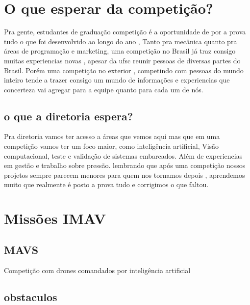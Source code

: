 \documentclass[letterpaper]{article}
\begin{document}
\section{ O que esperar da competição?}
Pra gente, estudantes de graduação competição é a oportunidade de por a prova tudo o que foi desenvolvido ao longo do ano , Tanto pra mecânica quanto pra áreas de programação e marketing, uma competição no Brasil já traz consigo muitas experiencias novas , apesar da ufsc reunir pessoas de diversas partes do Brasil. Porém uma competição no exterior , competindo com pessoas do mundo inteiro tende a trazer consigo um mundo de informações e experiencias que concerteza vai agregar para a equipe quanto para cada um de nós.

\subsection{o que a diretoria espera?}
Pra diretoria vamos ter acesso a áreas que vemos aqui  mas que em uma competição vamos ter um foco maior, como inteligência artificial, Visão computacional, teste e validação de sistemas embarcados. Além de experiencias em gestão e trabalho sobre pressão. lembrando que após uma competição nossos projetos  sempre parecem menores para quem nos tornamos depois  , aprendemos muito que realmente é posto a prova tudo e corrigimos o que faltou.

\section{Missões IMAV}

\subsection{MAVS}
Competição com drones comandados por inteligência artificial
\subsection{obstaculos}
\end{document}
